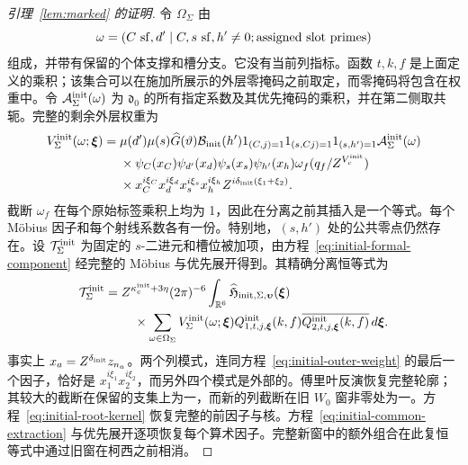 \documentclass[11pt,a4paper]{article}
\numberwithin{equation}{section}
\numberwithin{figure}{section}
\theoremstyle{definition}
\theoremstyle{remark}
\begin{document}
\begin{proof}[引理~\ref{lem:marked} 的证明]
令 \(\Omega_\Sigma\) 由
\[
 \omega=(C\ {\rm sf},d'\mid C,s\ {\rm sf},h'\ne0;
                      \text{assigned slot primes})
\]
组成，并带有保留的个体支撑和槽分支。它没有当前列指标。函数 \(t,k,f\) 是上面定义的乘积；该集合可以在施加所展示的外层零掩码之前取定，而零掩码将包含在权重中。令 \(\mathcal A_\Sigma^{\rm init}(\omega)\) 为 \(\mathfrak d_0\) 的所有指定系数及其优先掩码的乘积，并在第二侧取共轭。完整的剩余外层权重为
\begin{equation}\label{eq:initial-outer-weight}
 \begin{split}
 V_\Sigma^{\rm init}(\omega;\boldsymbol\xi)={}&
 \mu(d')\mu(s)\widehat G(\vartheta)\mathcal B_{\rm init}(h')
 1_{(C,j)=1}1_{(s,Cj)=1}1_{(s,h')=1}
 \mathcal A_\Sigma^{\rm init}(\omega)\\
 &\times\psi_C(x_C)\psi_{d'}(x_d)\psi_s(x_s)\psi_{h'}(x_h)
 \omega_f(q_f/Z^{V_c^{\rm init}})\\
 &\times x_C^{i\xi_C}x_d^{i\xi_d}x_s^{i\xi_s}x_h^{i\xi_h}
 Z^{i\delta_{\rm init}(\xi_1+\xi_2)}.
 \end{split}
\end{equation}
截断 \(\omega_f\) 在每个原始标签乘积上均为 1，因此在分离之前其插入是一个等式。每个 M\"obius 因子和每个射线系数各有一份。特别地，\((s,h')\) 处的公共零点仍然存在。设 \(\mathcal T_\Sigma^{\rm init}\) 为固定的 \(s\)-二进元和槽位被加项，由方程~\eqref{eq:initial-formal-component} 经完整的 M\"obius 与优先展开得到。其精确分离恒等式为
\begin{equation}\label{eq:initial-separated-identity}
 \begin{split}
 \mathcal T_\Sigma^{\rm init}={}&
 Z^{\kappa_c^{\rm init}+3\eta}(2\pi)^{-6}
 \int_{\mathbb R^6}
 \widehat{\mathfrak H}_{{\rm init},\Sigma,\boldsymbol\upsilon}
       (\boldsymbol\xi)\\
 &\quad\times\sum_{\omega\in\Omega_\Sigma}
 V_\Sigma^{\rm init}(\omega;\boldsymbol\xi)
 Q^{\rm init}_{1,t,j,\boldsymbol\xi}(k,f)
 \overline{Q^{\rm init}_{2,t,j,\boldsymbol\xi}(k,f)}
 \,d\boldsymbol\xi.
 \end{split}
\end{equation}
事实上 \(x_a=Z^{\delta_{\rm init}}z_{n_a}\)。两个列模式，连同方程~\eqref{eq:initial-outer-weight} 的最后一个因子，恰好是 \(x_1^{i\xi_1}x_2^{i\xi_2}\)，而另外四个模式是外部的。傅里叶反演恢复完整轮廓；其较大的截断在保留的支集上为一，而新的列截断在旧 \(W_0\) 窗非零处为一。方程~\eqref{eq:initial-root-kernel} 恢复完整的前因子与核。方程~\eqref{eq:initial-common-extraction} 与优先展开逐项恢复每个算术因子。完整新窗中的额外组合在此复恒等式中通过旧窗在柯西之前相消。


\end{proof}
\end{document}
